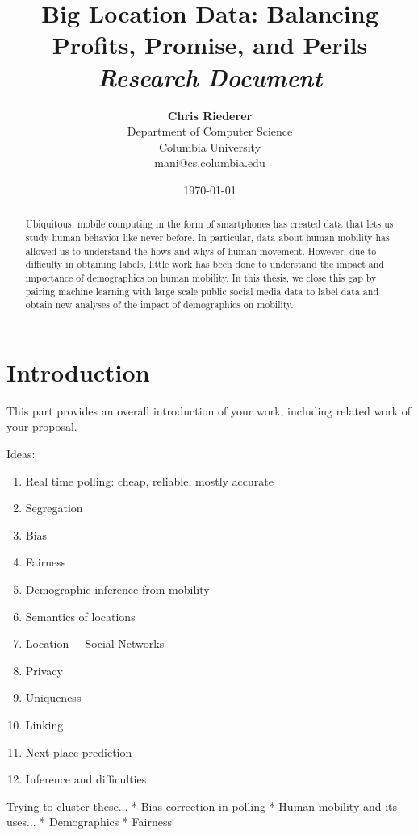 \documentclass[12pt]{article}
\title{{\bf Big Location Data: Balancing Profits, Promise, and Perils} \\
\it Research Document}
\author{ {\bf Chris Riederer}  \\
Department of Computer Science \\
Columbia University\\
{\small mani@cs.columbia.edu}
}
\date{\today}
\begin{document}
\pagestyle{plain}
\maketitle

\pagebreak
\begin{abstract}

Ubiquitous, mobile computing in the form of smartphones has created data that lets us study human behavior like never before.
In particular, data about human mobility has allowed us to understand the hows and whys of human movement.
However, due to difficulty in obtaining labels, little work has been done to understand the impact and importance of demographics on human mobility.
In this thesis, we close this gap by pairing machine learning with large scale public social media data to label data and obtain new analyses of the impact of demographics on mobility.


\end{abstract}

\pagebreak
\tableofcontents
\pagebreak

\cleardoublepage
{}

\section{Introduction}
\label{ch:intro}

This part provides an overall introduction of your work, including
related work of your proposal.

Ideas:
\begin{enumerate}
\item Real time polling: cheap, reliable, mostly accurate
\item Segregation
\item Bias
\item Fairness
\item Demographic inference from mobility
\item Semantics of locations
\item Location + Social Networks
\item Privacy
\item Uniqueness
\item Linking
\item Next place prediction
\item Inference and difficulties 
\end{enumerate}

Trying to cluster these...
* Bias correction in polling
* Human mobility and its uses...
* Demographics
* Fairness
\end{document}
